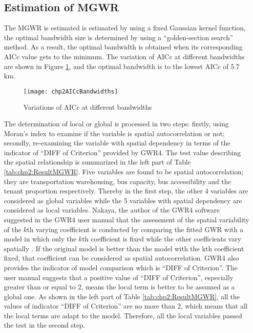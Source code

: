 \subsection{Estimation of MGWR}
%
The MGWR is estimated is estimated by using a fixed Gaussian kernel function,  the optimal bandwidth size is determined by using a “golden-section search” method. As a result, the optimal bandwidth is obtained when its corresponding AICc value gets to the minimum. The variation of AICc at different bandwidths are shown in Figure \ref{fig:chp2:AICcBandwidths}, and the optimal bandwidth is to the lowest AICc of 5.7 km.

\begin{figure}[htbp]
	\centering
	\texttt{[image: chp2AICcBandwidths]}
	\caption{Variations of AICc at different bandwidths}
	\label{fig:chp2:AICcBandwidths}
\end{figure}

The determination of local or global is processed in two steps: firstly, using Moran’s index to examine if the variable is spatial autocorrelation or not; secondly, re-examining the variable with spatial dependency in terms of the indicator of “DIFF of Criterion” provided by GWR4. The test value describing the spatial relationship is summarized in the left part of Table \ref{tab:chp2:ResultMGWR}. Five variables are found to be spatial autocorrelation; they are transportation warehousing, bus capacity, bus accessibility and the tenant proportion respectively. Thereby in the first step, the other 4 variables are considered as global variables while the 5 variables with spatial dependency are considered as local variables. Nakaya, the author of the GWR4 software suggested in the GWR4 user manual that the assessment of the spatial variability of the $k$th varying coefficient is conducted by comparing the fitted GWR with a model in which only the $k$th coefficient is fixed while the other coefficients vary spatially \cite{nakaya2014gwr4}. If the original model is better than the model with the kth coefficient fixed, that coefficient can be considered as spatial autocorrelation. GWR4 also provides the indicator of model comparison which is “DIFF of Criterion”. The user manual suggests that a positive value of “DIFF of Criterion”, especially greater than or equal to 2, means the local term is better to be assumed as a global one. As shown in the left part of Table \ref{tab:chp2:ResultMGWR}, all the values of indicator “DIFF of Criterion” are no more than 2, which means that all the local terms are adapt to the model. Therefore, all the local variables passed the test in the second step.

